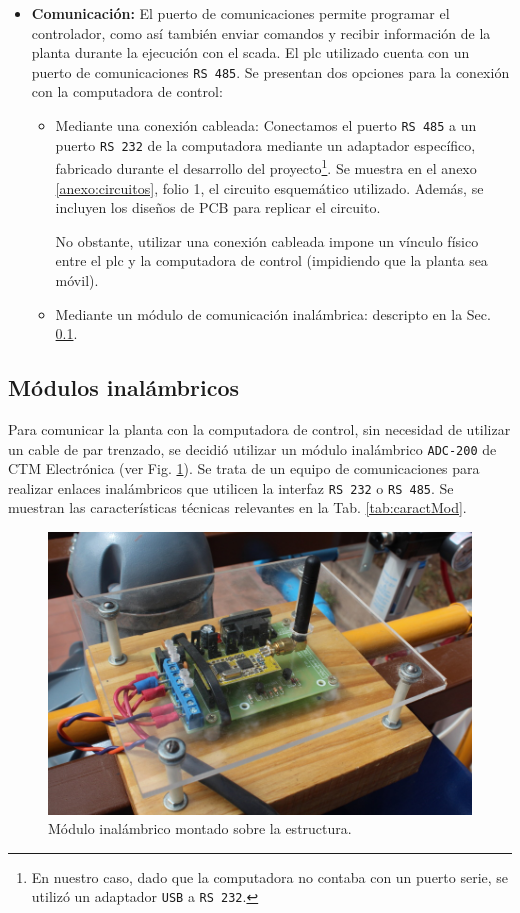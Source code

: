 \begin{itemize}
\item \textbf{Comunicación:} El puerto de comunicaciones permite programar el 
controlador, como así también enviar comandos y recibir información de
la planta durante la ejecución con el \gls{scada}.
El \gls{plc} utilizado cuenta con un puerto de comunicaciones \verb|RS 485|.
Se presentan dos opciones para la conexión con la computadora de control:
\begin{itemize}
 \item Mediante una conexión cableada:
 Conectamos el puerto \verb|RS 485| a un puerto \verb|RS 232| de la computadora
mediante un adaptador específico, fabricado durante el desarrollo del
proyecto\footnote{En nuestro caso, dado que la computadora no contaba con un
puerto serie, se utilizó un adaptador
\texttt{USB} a \texttt{RS 232}.}.
Se muestra en el anexo \ref{anexo:circuitos}, folio 1, el circuito esquemático
utilizado.
Además, se incluyen los diseños de PCB para replicar el circuito.

No obstante, utilizar una conexión cableada impone un vínculo físico entre
el \gls{plc} y la computadora de control (impidiendo que la planta sea móvil).
\item Mediante un módulo de comunicación inalámbrica:
descripto en la Sec. \ref{subsec:inalambrico}.
\end{itemize}
\end{itemize}

\subsection{Módulos inalámbricos}
\label{subsec:inalambrico}

Para comunicar la planta con la computadora de control, sin necesidad de
utilizar un cable de par trenzado, se decidió utilizar un módulo inalámbrico
\verb|ADC-200| de CTM Electrónica (ver Fig. \ref{fig:fotoModuloIn}).
Se trata de un equipo de comunicaciones para realizar enlaces inalámbricos que
utilicen la interfaz \verb|RS 232| o \verb|RS 485|.
Se muestran las características técnicas relevantes en la Tab.
\ref{tab:caractMod}.

\begin{figure}[t]
\centering
\includegraphics[width=.6\textwidth]{Cap3-TableroElectrico/Images/IMG_5038.JPG}
 \caption{Módulo inalámbrico montado sobre la estructura.}
 \label{fig:fotoModuloIn}
\end{figure}


